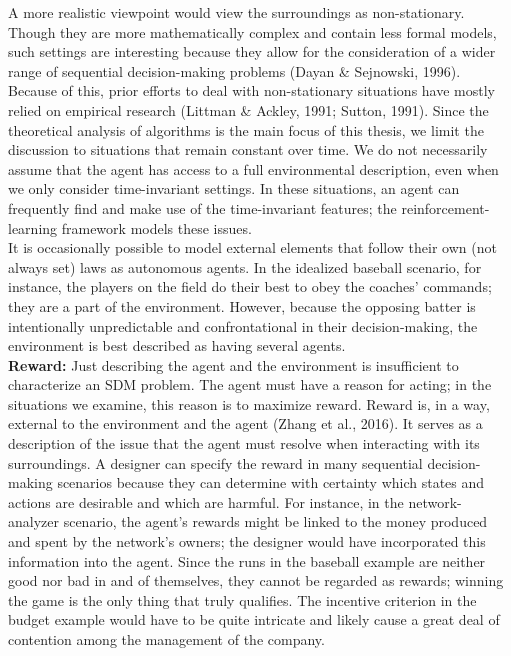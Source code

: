 \documentclass[a4paper,11pt,onecolumn]{article}
\begin{document}
A more realistic viewpoint would view the surroundings as non-stationary. Though they are more mathematically complex and contain less formal models, such settings are interesting because they allow for the consideration of a wider range of sequential decision-making problems (Dayan & Sejnowski, 1996). Because of this, prior efforts to deal with non-stationary situations have mostly relied on empirical research (Littman & Ackley, 1991; Sutton, 1991).  Since the theoretical analysis of algorithms is the main focus of this thesis, we limit the discussion to situations that remain constant over time. We do not necessarily assume that the agent has access to a full environmental description, even when we only consider time-invariant settings. In these situations, an agent can frequently find and make use of the time-invariant features; the reinforcement-learning framework models these issues.\\
It is occasionally possible to model external elements that follow their own (not always set) laws as autonomous agents. In the idealized baseball scenario, for instance, the players on the field do their best to obey the coaches' commands; they are a part of the environment. However, because the opposing batter is intentionally unpredictable and confrontational in their decision-making, the environment is best described as having several agents.\\
\textbf{Reward:} Just describing the agent and the environment is insufficient to characterize an SDM problem. The agent must have a reason for acting; in the situations we examine, this reason is to maximize reward. Reward is, in a way, external to the environment and the agent (Zhang et al., 2016).  It serves as a description of the issue that the agent must resolve when interacting with its surroundings. A designer can specify the reward in many sequential decision-making scenarios because they can determine with certainty which states and actions are desirable and which are harmful.  For instance, in the network-analyzer scenario, the agent's rewards might be linked to the money produced and spent by the network's owners; the designer would have incorporated this information into the agent. Since the runs in the baseball example are neither good nor bad in and of themselves, they cannot be regarded as rewards; winning the game is the only thing that truly qualifies. The incentive criterion in the budget example would have to be quite intricate and likely cause a great deal of contention among the management of the company.\\
\end{document}
